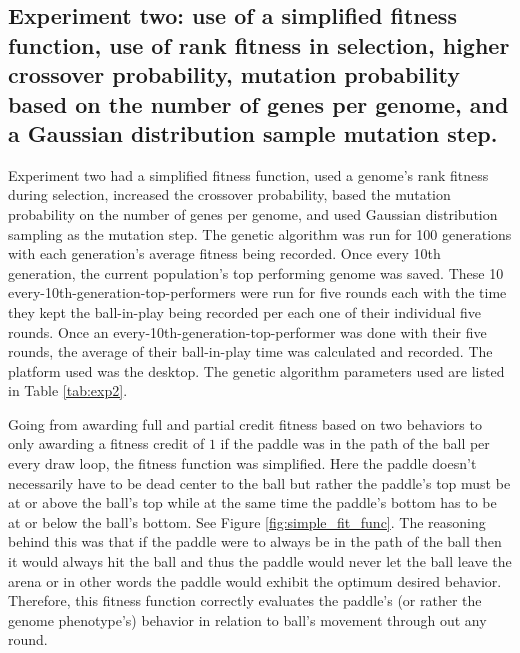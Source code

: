 \documentclass[a4paper,10pt]{article}
\begin{document}
\subsection{Experiment two: use of a simplified fitness function, use of rank fitness in selection, higher crossover probability, mutation probability based on the number of genes per genome, and a Gaussian distribution sample mutation step.}


Experiment two had a simplified fitness function, used a genome's rank fitness during selection, increased the crossover probability, based the mutation probability on the number of genes per genome, and used Gaussian distribution sampling as the mutation step. The genetic algorithm was run for 100 generations with each generation's average fitness being recorded. Once every 10th generation, the current population's top performing genome was saved. These 10 every-10th-generation-top-performers were run for five rounds each with the time they kept the ball-in-play being recorded per each one of their individual five rounds. Once an every-10th-generation-top-performer was done with their five rounds, the average of their ball-in-play time was calculated and recorded. The platform used was the desktop. The genetic algorithm parameters used are listed in Table \ref{tab:exp2}.

Going from awarding full and partial credit fitness based on two behaviors to only awarding a fitness credit of $1$ if the paddle was in the path of the ball per every draw loop, the fitness function was simplified. Here the paddle doesn't necessarily have to be dead center to the ball but rather the paddle's top must be at or above the ball's top while at the same time the paddle's bottom has to be at or below the ball's bottom. See Figure \ref{fig:simple_fit_func}. The reasoning behind this was that if the paddle were to always be in the path of the ball then it would always hit the ball and thus the paddle would never let the ball leave the arena or in other words the paddle would exhibit the optimum desired behavior. Therefore, this fitness function correctly evaluates the paddle's (or rather the genome phenotype's) behavior in relation to ball's movement through out any round.
\end{document}
